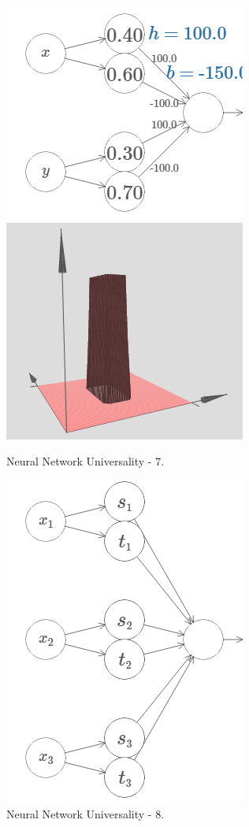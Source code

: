 \documentclass[]{book}
\begin{document}
\begin{figure}

{\centering \includegraphics[width=0.5\linewidth]{fig/04_tikz47} \includegraphics[width=0.5\linewidth]{fig/04_tikz47_2} 

}

\caption{Neural Network Universality - 7.}\label{fig:vsnn-nnup-07}
\end{figure}

\begin{figure}

{\centering \includegraphics[width=0.4\linewidth]{fig/04_tikz48} 

}

\caption{Neural Network Universality - 8.}\label{fig:vsnn-nnup-08}
\end{figure}
\end{document}
